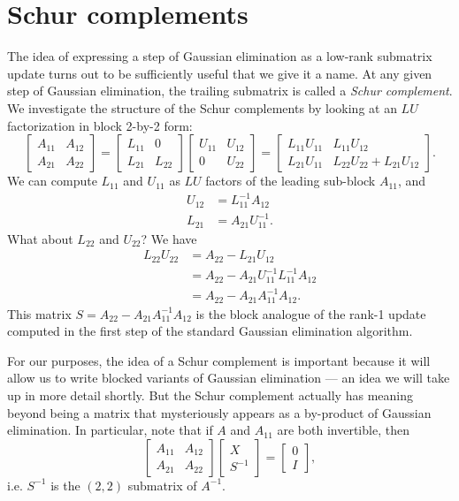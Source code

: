 \section{Schur complements}

The idea of expressing a step of Gaussian elimination as a low-rank
submatrix update turns out to be sufficiently useful that we give it
a name.  At any given step of Gaussian elimination, the trailing
submatrix is called a {\em Schur complement}.  We investigate the
structure of the Schur complements by looking at an $LU$
factorization in block 2-by-2 form:
\[
  \begin{bmatrix}
    A_{11} & A_{12} \\
    A_{21} & A_{22}
  \end{bmatrix} =
  \begin{bmatrix}
    L_{11} & 0 \\
    L_{21} & L_{22}
  \end{bmatrix}
  \begin{bmatrix}
    U_{11} & U_{12} \\
        0 & U_{22}
  \end{bmatrix} =
  \begin{bmatrix}
    L_{11} U_{11} & L_{11} U_{12} \\
    L_{21} U_{11} & L_{22} U_{22} + L_{21} U_{12}
  \end{bmatrix}.
\]
We can compute $L_{11}$ and $U_{11}$ as $LU$ factors of the leading
sub-block $A_{11}$, and
\begin{align*}
  U_{12} &= L_{11}^{-1} A_{12} \\
  L_{21} &= A_{21} U_{11}^{-1}.
\end{align*}
What about $L_{22}$ and $U_{22}$?  We have
\begin{align*}
  L_{22} U_{22}
  &= A_{22} - L_{21} U_{12} \\
  &= A_{22} - A_{21} U_{11}^{-1} L_{11}^{-1} A_{12} \\
  &= A_{22} - A_{21} A_{11}^{-1} A_{12}.
\end{align*}
This matrix $S = A_{22} - A_{21} A_{11}^{-1} A_{12}$ is the block analogue
of the rank-1 update computed in the first step of the standard
Gaussian elimination algorithm.

For our purposes, the idea of a Schur complement is important because
it will allow us to write blocked variants of Gaussian elimination ---
an idea we will take up in more detail shortly.
But the Schur complement actually has meaning beyond being a matrix that
mysteriously appears as a by-product of Gaussian elimination.
In particular, note that if $A$ and $A_{11}$ are both invertible,
then
\[
  \begin{bmatrix} A_{11} & A_{12} \\ A_{21} & A_{22} \end{bmatrix}
  \begin{bmatrix} X \\ S^{-1} \end{bmatrix} =
  \begin{bmatrix} 0 \\ I \end{bmatrix},
\]
i.e. $S^{-1}$ is the $(2,2)$ submatrix of $A^{-1}$.
